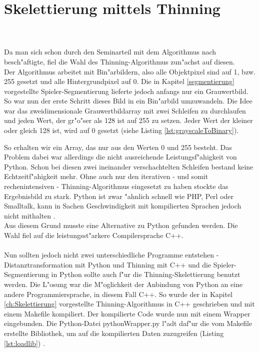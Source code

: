 \section{Skelettierung mittels Thinning} 
\label{implThinning}
 \\ \\
Da man sich schon durch den Seminarteil mit dem Algorithmus nach \cite{thinning} besch"aftigte, fiel die Wahl des Thinning-Algorithmus zun"achst auf diesen. \\
Der Algorithmus arbeitet mit Bin"arbildern, also alle Objektpixel sind auf 1, bzw. 255 gesetzt und alle Hintergrundpixel auf 0. Die in Kapitel \ref{segmentierung} vorgestellte Spieler-Segmentierung lieferte jedoch anfangs nur ein Grauwertbild. So war nun der erste Schritt dieses Bild in ein Bin"arbild umzuwandeln. Die Idee war das zweidimensionale Grauwertbildarray mit zwei Schleifen zu durchlaufen und jeden Wert, der gr"o"ser als 128 ist auf 255 zu setzen. Jeder Wert der kleiner oder gleich 128 ist, wird auf 0 gesetzt (siehe Listing \ref{lst:grayscaleToBinary}). 

So erhalten wir ein Array, das nur aus den Werten 0 und 255 besteht. Das Problem dabei war allerdings die nicht ausreichende Leistungsf"ahigkeit von Python. Schon bei diesen zwei ineinander verschachtelten Schleifen bestand keine Echtzeitf"ahigkeit mehr. Ohne auch nur den iterativen - und somit rechenintensiven - Thinning-Algorithmus eingesetzt zu haben stockte das Ergebnisbild zu stark. Python ist zwar "ahnlich schnell wie PHP, Perl oder Smalltalk, kann in Sachen Geschwindigkeit mit kompilierten Sprachen jedoch nicht mithalten \cite{python}. \\Aus diesem Grund musste eine Alternative zu Python gefunden werden. Die Wahl fiel auf die leistungsst"arkere Compilersprache C++. \\ \\
Nun sollten jedoch nicht zwei unterschiedliche Programme entstehen - Distanztransformation mit Python und Thinning mit C++ und die Spieler-Segmentierung in Python sollte auch f"ur die Thinning-Skelettierung benutzt werden. Die L"osung war die M"oglichkeit der Anbindung von Python an eine andere Programmiersprache, in diesem Fall C++. So wurde der in Kapitel \ref{ch:Skelettierung} vorgestellte Thinning-Algorithmus in C++ geschrieben und mit einem Makefile kompiliert. Der kompilierte Code wurde nun mit einem Wrapper eingebunden. Die Python-Datei pythonWrapper.py l"adt daf"ur die vom Makefile erstellte Bibliothek, um auf die kompilierten Daten zuzugreifen (Listing \ref{lst:loadlib}) .
